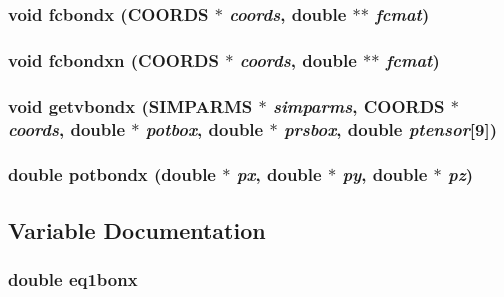 \subsubsection{\setlength{\rightskip}{0pt plus 5cm}void fcbondx ({\bf COORDS} $\ast$ {\em coords}, double $\ast$$\ast$ {\em fcmat})}\label{md__fbocross_8c_65d0f29aa925bc05aac4c18fa39853e2}


\subsubsection{\setlength{\rightskip}{0pt plus 5cm}void fcbondxn ({\bf COORDS} $\ast$ {\em coords}, double $\ast$$\ast$ {\em fcmat})}\label{md__fbocross_8c_fd1b89539b10c836f96afd0c9bcd53fa}


\subsubsection{\setlength{\rightskip}{0pt plus 5cm}void getvbondx ({\bf SIMPARMS} $\ast$ {\em simparms}, {\bf COORDS} $\ast$ {\em coords}, double $\ast$ {\em potbox}, double $\ast$ {\em prsbox}, double {\em ptensor}[9])}\label{md__fbocross_8c_91b2face303932602ec06116d168d17b}


\subsubsection{\setlength{\rightskip}{0pt plus 5cm}double potbondx (double $\ast$ {\em px}, double $\ast$ {\em py}, double $\ast$ {\em pz})}\label{md__fbocross_8c_525425e0c5cc1d564e60444adffee247}




\subsection{Variable Documentation}
\subsubsection{\setlength{\rightskip}{0pt plus 5cm}double {\bf eq1bonx}\hspace{0.3cm}{\tt  [static]}}\label{md__fbocross_8c_280fd3d8ae1c63e02a4f143709a4dd00}


